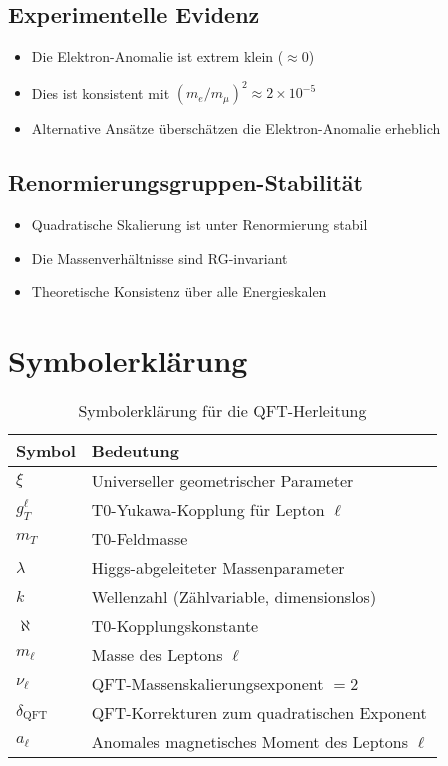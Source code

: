 \documentclass[12pt,a4paper]{article}
\begin{document}
	\subsection{Experimentelle Evidenz}
	\begin{itemize}
		\item Die Elektron-Anomalie ist extrem klein ($\approx 0$)
		\item Dies ist konsistent mit $(m_e/m_\mu)^2 \approx 2 \times 10^{-5}$
		\item Alternative Ansätze überschätzen die Elektron-Anomalie erheblich
	\end{itemize}
	
	\subsection{Renormierungsgruppen-Stabilität}
	\begin{itemize}
		\item Quadratische Skalierung ist unter Renormierung stabil
		\item Die Massenverhältnisse sind RG-invariant
		\item Theoretische Konsistenz über alle Energieskalen
	\end{itemize}
	
	\section{Symbolerklärung}
	
	\begin{table}[h]
		\centering
		\begin{tabular}{ll}
			\toprule
			\textbf{Symbol} & \textbf{Bedeutung} \\
			\midrule
			$\xi$ & Universeller geometrischer Parameter \\
			$g_T^\ell$ & T0-Yukawa-Kopplung für Lepton $\ell$ \\
			$m_T$ & T0-Feldmasse \\
			$\lambda$ & Higgs-abgeleiteter Massenparameter \\
			$k$ & Wellenzahl (Zählvariable, dimensionslos) \\
			$\aleph$ & T0-Kopplungskonstante \\
			$m_\ell$ & Masse des Leptons $\ell$ \\
			$\nu_\ell$ & QFT-Massenskalierungsexponent $= 2$ \\
			$\delta_{\text{QFT}}$ & QFT-Korrekturen zum quadratischen Exponent \\
			$a_\ell$ & Anomales magnetisches Moment des Leptons $\ell$ \\
			\bottomrule
		\end{tabular}
		\caption{Symbolerklärung für die QFT-Herleitung}
	\end{table}
	
\end{document}
